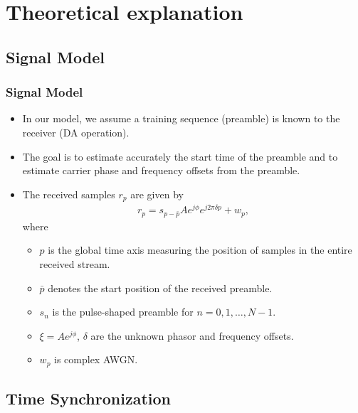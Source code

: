 \section{Theoretical explanation}

\subsection{Signal Model}

\begin{frame}
  \frametitle{Signal Model}
  \begin{itemize}
    \item In our model, we assume a training sequence (preamble) is known to the receiver (DA operation). 
    \item The goal is to estimate accurately the start time of the preamble and to estimate carrier phase and frequency offsets from the preamble. 
    \item The received samples $r_p$ are given by
\begin{equation}
    \begin{aligned}
      \label{eq:model}
      r_p = s_{p-\bar{p}}Ae^{j\phi}e^{j2\pi\delta p}+w_{p},
    \end{aligned}
  \end{equation}
where
\begin{itemize}
    \item $p$ is the global time axis measuring the position of samples in the entire received stream.
    \item $\bar{p}$ denotes the start position of the received preamble.
    \item $s_n$ is the pulse-shaped preamble for $n=0,1,\ldots,N-1$.
    \item $\xi=Ae^{j\phi}$, $\delta$ are the unknown phasor and frequency offsets.
    \item $w_p$ is complex AWGN.
\end{itemize}
\end{itemize}
  
\end{frame}

\subsection{Time Synchronization}

